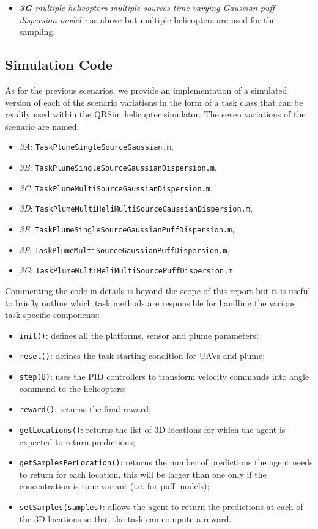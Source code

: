 \documentclass[a4paper,11pt]{report}
\newcommand{\sname}{QRSim\xspace}
\newcommand\mytexttt[1]{\texttt{\hyphenchar\font=45\relax #1}}
\begin{document}
\begin{itemize}
\item \textit{\textbf{3G} multiple helicopters multiple sources time-varying Gaussian puff dispersion model :} as above but multiple helicopters are used for the sampling.

\end{itemize}
 

\subsection{Simulation Code} \label{PlumeSim}

As for the previous scenarios, we provide an implementation of a simulated version of each of the scenario variations 
in the form of a task class that can be readily used within the \sname helicopter simulator.
The seven variations of the scenario are named:
\begin{itemize}
\item\textit{3A}: \mytexttt{TaskPlumeSingleSourceGaussian.m}, 
\item\textit{3B}: \mytexttt{TaskPlumeSingleSourceGaussianDispersion.m},
\item\textit{3C}: \mytexttt{TaskPlumeMultiSourceGaussianDispersion.m}, 
\item\textit{3D}: \mytexttt{TaskPlumeMultiHeliMultiSourceGaussianDispersion.m}, 
\item\textit{3E}: \mytexttt{TaskPlumeSingleSourceGaussianPuffDispersion.m}, 
\item\textit{3F}: \mytexttt{TaskPlumeMultiSourceGaussianPuffDispersion.m},
\item\textit{3G}: \mytexttt{TaskPlumeMultiHeliMultiSourcePuffDispersion.m}. 
\end{itemize}

Commenting the code in details is beyond the scope of this report but it is useful to briefly outline which task methods are responsible for handling the various task specific components:
\begin{itemize}
\item\mytexttt{init()}: defines all the platforms, sensor and plume parameters;
\item\mytexttt{reset()}: defines the task starting condition for UAVs and plume;
\item\mytexttt{step(U)}: uses the PID controllers to transform velocity commands into angle command to the helicopters;
\item\mytexttt{reward()}: returns the final reward;
\item\mytexttt{getLocations()}: returns the list of 3D locations for which the agent is expected to return predictions;
\item\mytexttt{getSamplesPerLocation()}: returns the number of predictions the agent needs to return for each location, this will be larger than one only if the concentration is time variant (i.e. for puff models);
\item\mytexttt{setSamples(samples)}: allows the agent to return the predictions at each of the 3D locations so that the task can compute a reward.
\end{itemize}
\end{document}
